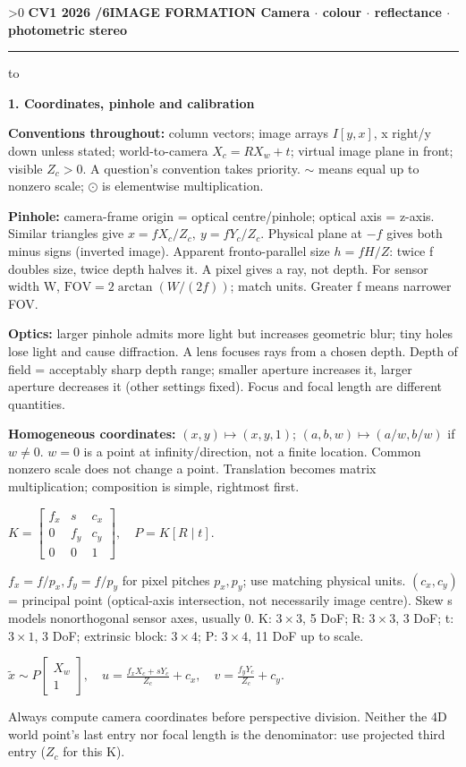 \documentclass[a4paper]{article}
\newcommand{\key}[1]{\textbf{#1}}
\newcommand{\Topic}[1]{\par\vspace{1.7pt}\noindent
  {\fontsize{7.7}{8.0}\selectfont\bfseries #1}\par\vspace{0.3pt}}
\newcommand{\eq}[1]{\par\noindent\mbox{\(\displaystyle #1\)}\par}
\newcommand{\smat}[1]{\left[\begin{smallmatrix}#1\end{smallmatrix}\right]}
\newcounter{sheet}
\newcounter{sheetcolumn}
\newlength{\colwidth}
\newlength{\colmax}
\newcommand{\Sheet}[2]{\ifnum\value{sheet}>0\newpage\fi
  \stepcounter{sheet}\setcounter{sheetcolumn}{0}
  {\fontsize{8.5}{9}\selectfont\bfseries CV1 2026 \quad \thesheet/6\quad #1
  \hfill {\fontsize{6.3}{7}\selectfont #2}}\par
  \vspace{-1pt}\hrule height 0.35pt\vspace{2pt}\noindent
  \hbox to\textwidth\bgroup\ignorespaces}
\newenvironment{sheetcol}[1][7.0]{\stepcounter{sheetcolumn}
  \begin{lrbox}{\columnbox}\begin{minipage}[t]{\colwidth}\vspace{0pt}
  \fontsize{#1}{\dimexpr#1pt+0.6pt\relax}\selectfont}
  {\end{minipage}\end{lrbox}
  \typeout{CV1COL|\thesheet|\thesheetcolumn|\the\dimexpr\ht\columnbox+\dp\columnbox\relax}
  \usebox{\columnbox}\ignorespacesafterend}
\begin{document}

\Sheet{IMAGE FORMATION}{Camera \(\cdot\) colour \(\cdot\) reflectance \(\cdot\) photometric stereo}
\begin{sheetcol}[6.85]
\Topic{1. Coordinates, pinhole and calibration}
\key{Conventions throughout:} column vectors; image arrays \(I[y,x]\), x right/y down unless stated; world-to-camera \(X_c=RX_w+t\); virtual image plane in front; visible \(Z_c>0\). A question's convention takes priority. \(\sim\) means equal up to nonzero scale; \(\odot\) is elementwise multiplication.

\key{Pinhole:} camera-frame origin = optical centre/pinhole; optical axis = z-axis. Similar triangles give \(x=fX_c/Z_c,\ y=fY_c/Z_c\). Physical plane at \(-f\) gives both minus signs (inverted image). Apparent fronto-parallel size \(h=fH/Z\): twice f doubles size, twice depth halves it. A pixel gives a ray, not depth. For sensor width W, \(\mathrm{FOV}=2\arctan(W/(2f))\); match units. Greater f means narrower FOV.

\key{Optics:} larger pinhole admits more light but increases geometric blur; tiny holes lose light and cause diffraction. A lens focuses rays from a chosen depth. Depth of field = acceptably sharp depth range; smaller aperture increases it, larger aperture decreases it (other settings fixed). Focus and focal length are different quantities.

\key{Homogeneous coordinates:} \((x,y)\mapsto(x,y,1)\); \((a,b,w)\mapsto(a/w,b/w)\) if \(w\ne0\). \(w=0\) is a point at infinity/direction, not a finite location. Common nonzero scale does not change a point. Translation becomes matrix multiplication; composition is simple, rightmost first.

\eq{K=\smat{f_x&s&c_x\\0&f_y&c_y\\0&0&1},\quad P=K[R\mid t].}
\(f_x=f/p_x, f_y=f/p_y\) for pixel pitches \(p_x,p_y\); use matching physical units. \((c_x,c_y)\) = principal point (optical-axis intersection, not necessarily image centre). Skew s models nonorthogonal sensor axes, usually 0. K: \(3\!\times\!3\), 5 DoF; R: \(3\!\times\!3\), 3 DoF; t: \(3\!\times\!1\), 3 DoF; extrinsic block: \(3\!\times\!4\); P: \(3\!\times\!4\), 11 DoF up to scale.

\eq{\tilde x\sim P\smat{X_w\\1},\quad
 u=\frac{f_xX_c+sY_c}{Z_c}+c_x,\quad
 v=\frac{f_yY_c}{Z_c}+c_y.}
Always compute camera coordinates before perspective division. Neither the 4D world point's last entry nor focal length is the denominator: use projected third entry (\(Z_c\) for this K).


\end{sheetcol}
\end{document}
